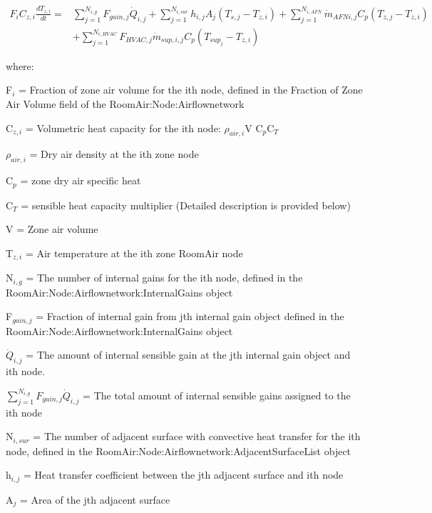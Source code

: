 \begin{equation}
\begin{split}
{F_i}{C_{z,i}}\frac{{d{T_{z,i}}}}{{dt}} =& \sum\limits_{j = 1}^{{N_{i,g}}} {{F_{gain,j}{\dot Q}_{i,j}}}  + \sum\limits_{j = 1}^{{N_{i,sur}}} {{h_{i,j}}} {A_j}\left( {{T_{s,j}} - {T_{z,i}}} \right) + \sum\limits_{j = 1}^{{N_{i,AFN}}} {{{\dot m}_{AFN i,j}}} {C_p}\left( {{T_{z,j}} - {T_{z,i}}} \right)\, \\
&+ \sum\limits_{j = 1}^{{N_{i,HVAC}}} {{{F_{HVAC,j}}{\dot m}_{sup,i,j}}} {C_p}\left( {{T_{sup_j}} - {T_{z,i}}} \right)
\end{split}
\end{equation}

where:

F\(_{i}\) = Fraction of zone air volume for the ith node, defined in the Fraction of Zone Air Volume field of the RoomAir:Node:Airflownetwork

C\(_{z,i}\) = Volumetric heat capacity for the ith node: \(\rho_{air,i}\)V C\(_{p}\)C\(_{T}\)

\(\rho_{air,i}\) = Dry air density at the ith zone node

C\(_{p}\) = zone dry air specific heat

C\(_{T}\) = sensible heat capacity multiplier (Detailed description is provided below)

V = Zone air volume

T\(_{z,i}\) = Air temperature at the ith zone RoomAir node

N\(_{i,g}\) = The number of internal gains for the ith node, defined in the RoomAir:Node:Airflownetwork:InternalGains object

F\(_{gain,j}\) = Fraction of internal gain from jth internal gain object defined in the RoomAir:Node:Airflownetwork:InternalGains object

\({\dot Q}_{i,j}\) = The amount of internal sensible gain at the jth internal gain object and ith node.

\({\sum\limits_{j = 1}^{N_{i,g}} F_{gain,j}{\dot Q}_{i,j}}\) = The total amount of internal sensible gains assigned to the ith node

N\(_{i,sur}\) = The number of adjacent surface with convective heat transfer for the ith node, defined in the RoomAir:Node:Airflownetwork:AdjacentSurfaceList object

h\(_{i,j}\) = Heat transfer coefficient between the jth adjacent surface and ith node

A\(_{j}\) = Area of the jth adjacent surface


